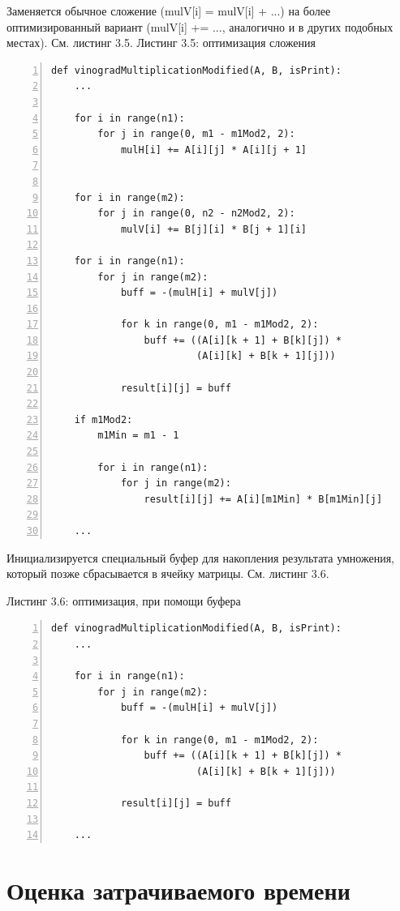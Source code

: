 \documentclass[12pt,a4paper]{report}
\begin{document}
Заменяется обычное сложение (mulV[i] = mulV[i] + ...) на более оптимизированный вариант (mulV[i] += ..., аналогично 
и в других подобных местах). См. листинг 3.5.
\newpage
\textrm{Листинг 3.5: оптимизация сложения}
\begin{lstlisting}[frame=single, numbers=left]
def vinogradMultiplicationModified(A, B, isPrint):
    ...

    for i in range(n1):
        for j in range(0, m1 - m1Mod2, 2):
            mulH[i] += A[i][j] * A[i][j + 1]


    for i in range(m2):
        for j in range(0, n2 - n2Mod2, 2):
            mulV[i] += B[j][i] * B[j + 1][i]

    for i in range(n1):
        for j in range(m2):
            buff = -(mulH[i] + mulV[j])

            for k in range(0, m1 - m1Mod2, 2):
                buff += ((A[i][k + 1] + B[k][j]) * 
                         (A[i][k] + B[k + 1][j]))

            result[i][j] = buff
    
    if m1Mod2:
        m1Min = m1 - 1
        
        for i in range(n1):
            for j in range(m2):
                result[i][j] += A[i][m1Min] * B[m1Min][j]

    ...
\end{lstlisting}

Инициализируется специальный буфер для накопления результата умножения, который позже сбрасывается 
в ячейку матрицы. См. листинг 3.6.

\textrm{Листинг 3.6: оптимизация, при помощи буфера}
\begin{lstlisting}[frame=single, numbers=left]
def vinogradMultiplicationModified(A, B, isPrint):
    ...

    for i in range(n1):
        for j in range(m2):
            buff = -(mulH[i] + mulV[j])

            for k in range(0, m1 - m1Mod2, 2):
                buff += ((A[i][k + 1] + B[k][j]) * 
                         (A[i][k] + B[k + 1][j]))

            result[i][j] = buff

    ...
\end{lstlisting}

\section{Оценка затрачиваемого времени}
\end{document}
